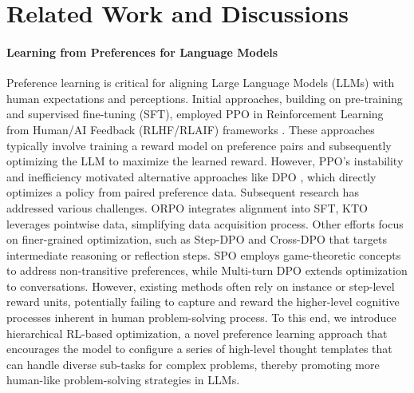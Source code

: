 \section{Related Work and Discussions}
\paragraph{Learning from Preferences for Language Models}


Preference learning is critical for aligning Large Language Models (LLMs) with human expectations and perceptions. Initial approaches, building on pre-training and supervised fine-tuning (SFT), employed PPO in Reinforcement Learning from Human/AI Feedback (RLHF/RLAIF) frameworks \citep{PPO,christiano2017deep,ouyang2022training,MCTSDPO}. These approaches typically involve training a reward model on preference pairs and subsequently optimizing the LLM to maximize the learned reward. However, PPO's instability and inefficiency motivated alternative approaches like DPO \citep{DPO}, which directly optimizes a policy from paired preference data.
Subsequent research has addressed various challenges. ORPO \citep{ORPO} integrates alignment into SFT, KTO \citep{KTO} leverages pointwise data, simplifying data acquisition process. Other efforts focus on finer-grained optimization, such as Step-DPO \citep{StepDPO} and Cross-DPO \citep{yang2024supercorrect} that targets intermediate reasoning or reflection steps. SPO \citep{MinMaxPPO} employs game-theoretic concepts to address non-transitive preferences, while Multi-turn DPO \citep{DMPO} extends optimization to conversations. 
However, existing methods often rely on instance or step-level reward units, potentially failing to capture and reward the higher-level cognitive processes inherent in human problem-solving process. 
To this end, we introduce hierarchical RL-based optimization, a novel preference learning approach that encourages the model to configure a series of high-level thought templates that can handle diverse sub-tasks for complex problems, thereby promoting more human-like problem-solving strategies in LLMs.


